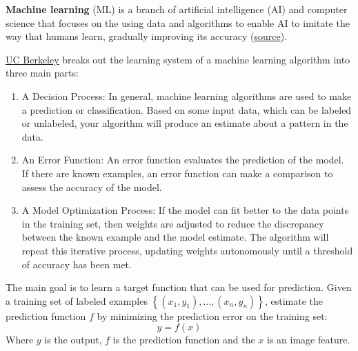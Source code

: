 \newpage

\begin{deepeningbox}
    \textbf{Machine learning} (ML) is a branch of artificial intelligence (AI) and computer science that focuses on the using data and algorithms to enable AI to imitate the way that humans learn, gradually improving its accuracy (\href{https://www.ibm.com/topics/machine-learning}{source}).

    \highspace
    \href{https://ischoolonline.berkeley.edu/blog/what-is-machine-learning/}{UC Berkeley} breaks out the learning system of a machine learning algorithm into three main parts:
    \begin{enumerate}
        \item A Decision Process: In general, machine learning algorithms are used to make a prediction or classification. Based on some input data, which can be labeled or unlabeled, your algorithm will produce an estimate about a pattern in the data.

        \item An Error Function: An error function evaluates the prediction of the model. If there are known examples, an error function can make a comparison to assess the accuracy of the model.

        \item A Model Optimization Process: If the model can fit better to the data points in the training set, then weights are adjusted to reduce the discrepancy between the known example and the model estimate. The algorithm will repeat this iterative  process, updating weights autonomously until a threshold of accuracy has been met.
    \end{enumerate}

    \highspace
    The main goal is to learn a target function that can be used for prediction. Given a training set of labeled examples $\left\{\left(x_{1}, y_{1}\right), \dots, \left(x_{n}, y_{n}\right)\right\}$, estimate the prediction function $f$ by minimizing the prediction error on the training set:
    \begin{equation*}
        y = f\left(x\right)
    \end{equation*}
    Where $y$ is the output, $f$ is the prediction function and the $x$ is an image feature.
\end{deepeningbox}

